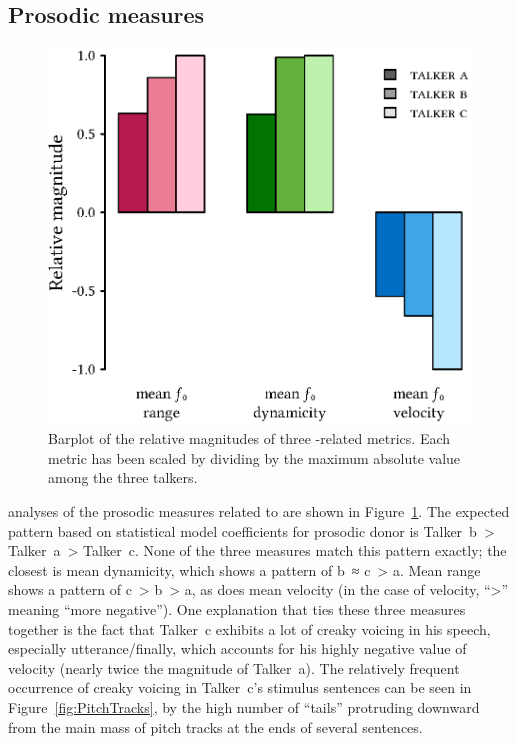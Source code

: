 \subsection{Prosodic measures}
\begin{figure}[bt]
	\begin{centering}
	\includegraphics{figures/posthocs/ProsodicMeasuresPitchOnly.eps}
	\caption[Barplot of \fo{} metrics]{Barplot of the relative magnitudes of three \fo-related metrics.  Each metric has been scaled by dividing by the maximum absolute value among the three talkers.\label{fig:ProsodicMeasuresPitch}}
	\end{centering}
\end{figure}

\Ph{} analyses of the prosodic measures related to \fo{} are shown in Figure~\ref{fig:ProsodicMeasuresPitch}.  The expected pattern based on statistical model coefficients for prosodic donor is Talker~\ac{b}~> Talker~\ac{a}~> Talker~\ac{c}.  None of the three measures match this pattern exactly; the closest is mean \fo{} dynamicity, which shows a pattern of \ac{b}~≈ \ac{c}~> \ac{a}.  Mean \fo{} range shows a pattern of \ac{c}~> \ac{b}~> \ac{a}, as does mean \fo{} velocity (in the case of velocity, “>” meaning “more negative”).\footnotemark{}  One explanation that ties these three measures together is the fact that Talker~\ac{c} exhibits a lot of creaky voicing in his speech, especially utterance\-/finally, which accounts for his highly negative value of \fo{} velocity (nearly twice the magnitude of Talker~\ac{a}).  The relatively frequent occurrence of creaky voicing in Talker~\ac{c}’s stimulus sentences can be seen in Figure~\ref{fig:PitchTracks}, by the high number of “tails” protruding downward from the main mass of pitch tracks at the ends of several sentences.

